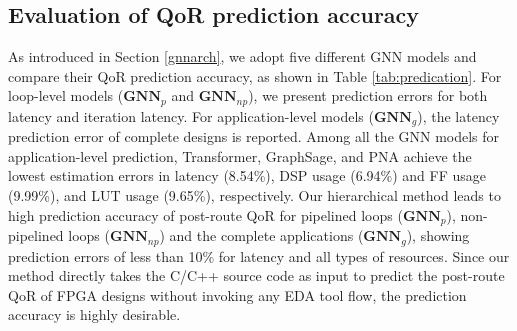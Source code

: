 \documentclass[conference]{IEEEtran}
\begin{document}
\vspace{-0.1cm} 
\subsection{Evaluation of QoR prediction accuracy}
\vspace{-0.1cm} 

As introduced in Section \ref{gnnarch}, we adopt five different GNN models and compare their QoR prediction accuracy, as shown in Table \ref{tab:predication}. For loop-level models ($\textbf{GNN}_p$ and $\textbf{GNN}_{np}$), we present prediction errors for both latency and iteration latency. For application-level models ($\textbf{GNN}_g$), the latency prediction error of complete designs is reported. Among all the GNN models for application-level prediction, Transformer, GraphSage, and PNA achieve the lowest estimation errors in latency (8.54\%), DSP usage (6.94\%) and FF usage (9.99\%), and LUT usage (9.65\%), respectively. Our hierarchical method leads to high prediction accuracy of post-route QoR for pipelined loops ($\textbf{GNN}_p$), non-pipelined loops ($\textbf{GNN}_{np}$) and the complete applications ($\textbf{GNN}_g$), showing prediction errors of less than 10\% for latency and all types of resources. Since our method directly takes the C/C++ source code as input to predict the post-route QoR of FPGA designs without invoking any EDA tool flow, the prediction accuracy is highly desirable. 
\end{document}

